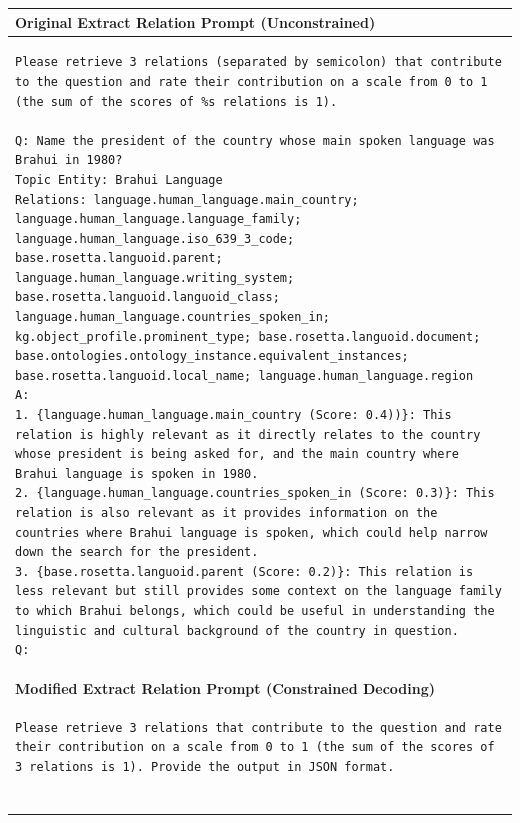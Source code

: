 \documentclass[11pt]{article}
\begin{document}
\begin{table}[t]
\centering
\begin{tabular}{|p{}|}
\hline
\textbf{\small Original Extract Relation Prompt (Unconstrained)} \\
\hline
\begin{lstlisting}[basicstyle=\small\rmfamily,lineskip=0.1ex,aboveskip=0.2ex,belowskip=0.2ex,breaklines=true,columns=fullflexible ]
Please retrieve 3 relations (separated by semicolon) that contribute to the question and rate their contribution on a scale from 0 to 1 (the sum of the scores of %s relations is 1).

Q: Name the president of the country whose main spoken language was Brahui in 1980?
Topic Entity: Brahui Language
Relations: language.human_language.main_country; language.human_language.language_family; language.human_language.iso_639_3_code; base.rosetta.languoid.parent; language.human_language.writing_system; base.rosetta.languoid.languoid_class; language.human_language.countries_spoken_in; kg.object_profile.prominent_type; base.rosetta.languoid.document; base.ontologies.ontology_instance.equivalent_instances; base.rosetta.languoid.local_name; language.human_language.region
A: 
1. {language.human_language.main_country (Score: 0.4))}: This relation is highly relevant as it directly relates to the country whose president is being asked for, and the main country where Brahui language is spoken in 1980.
2. {language.human_language.countries_spoken_in (Score: 0.3)}: This relation is also relevant as it provides information on the countries where Brahui language is spoken, which could help narrow down the search for the president.
3. {base.rosetta.languoid.parent (Score: 0.2)}: This relation is less relevant but still provides some context on the language family to which Brahui belongs, which could be useful in understanding the linguistic and cultural background of the country in question.
Q:
\end{lstlisting}\\
\hline
\textbf{\small Modified Extract Relation Prompt (Constrained Decoding)} \\
\hline
\begin{lstlisting}[basicstyle=\small\rmfamily,lineskip=0.2ex,aboveskip=0ex,belowskip=0ex,breaklines=true,columns=fullflexible ]
Please retrieve 3 relations that contribute to the question and rate their contribution on a scale from 0 to 1 (the sum of the scores of 3 relations is 1). Provide the output in JSON format.


\end{lstlisting}
\end{tabular}
\end{table}
\end{document}
